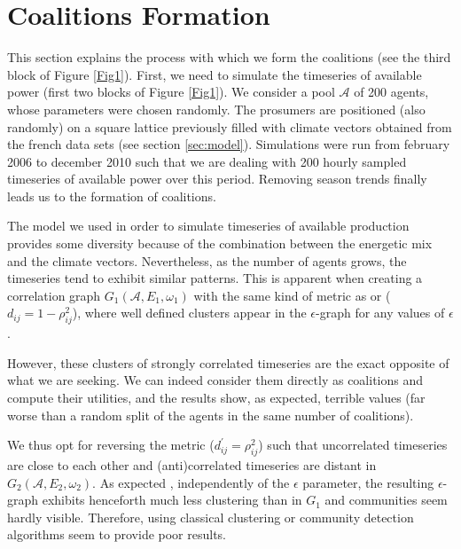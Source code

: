 \documentclass[conference]{IEEEtran}
\begin{document}
\section{Coalitions Formation}
\label{sec:forming}

This section explains the process with which we form the coalitions (see the third block of Figure \ref{Fig1}). First, we need to simulate the timeseries of available power (first two blocks of Figure \ref{Fig1}). We consider a pool $ \mathcal{A} $ of 200 agents, whose parameters were chosen randomly. The prosumers are positioned (also randomly) on a square lattice previously filled with climate vectors obtained from the french data sets (see section \ref{sec:model}). Simulations were run from february 2006 to december 2010 such that we are dealing with 200 hourly sampled timeseries of available power over this period. Removing season trends finally leads us to the formation of coalitions. 

The model we used in order to simulate timeseries of available production provides some diversity because of the combination between the energetic mix and the climate vectors. Nevertheless, as the number of agents grows, the timeseries tend to exhibit similar patterns. This is apparent when creating a correlation graph $ G_{1}(\mathcal{A},E_{1},\omega_{1}) $ with the same kind of metric as \cite{Garas2008} or \cite{Onnela2004} ($ d_{ij} = 1 - \rho_{ij}^{2} $), where well defined clusters appear in the $ \epsilon $-graph for any values of $ \epsilon $. 

However, these clusters of strongly correlated timeseries are the exact opposite of what we are seeking. We can indeed consider them directly as coalitions and compute their utilities, and the results show, as expected, terrible values (far worse than a random split of the agents in the same number of coalitions).

We thus opt for reversing the metric ($ d_{ij}^{'} = \rho_{ij}^{2} $) such that uncorrelated timeseries are close to each other and (anti)correlated timeseries are distant in $ G_{2}(\mathcal{A},E_{2},\omega_{2}) $. As expected \cite{Onnela2004}, independently of the $ \epsilon $ parameter, the resulting $ \epsilon $-graph exhibits henceforth much less clustering than in $ G_{1} $ and communities seem hardly visible. Therefore, using classical clustering or community detection algorithms seem to provide poor results. 
\end{document}
